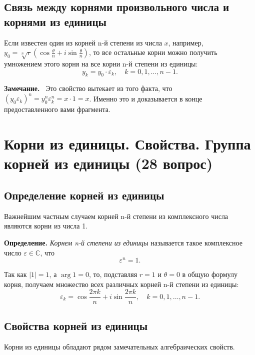 \documentclass[a4paper,12pt]{article}
\newcommand{\myremark}{\textbf{Замечание.}\ }
\theoremstyle{definition}
\theoremstyle{plain}
\theoremstyle{remark}
\begin{document}
	\subsection{Связь между корнями произвольного числа и корнями из единицы}
	
	Если известен один из корней n-й степени из числа \( x \), например, \( y_0 = \sqrt[n]{r}(\cos \frac{\theta}{n} + i \sin \frac{\theta}{n}) \), то все остальные корни можно получить умножением этого корня на все корни n-й степени из единицы:
	\[
	y_k = y_0 \cdot \varepsilon_k, \quad k = 0, 1, \dots, n-1.
	\]
	
	\myremark
	Это свойство вытекает из того факта, что \( (y_0 \varepsilon_k)^n = y_0^n \varepsilon_k^n = x \cdot 1 = x \). Именно это и доказывается в конце предоставленного вами фрагмента.
	
	
	
	
	
	
	
	\newpage
	\section{Корни из единицы. Свойства. Группа корней из единицы (28 вопрос)}
	
	\subsection{Определение корней из единицы}
	
	Важнейшим частным случаем корней n-й степени из комплексного числа являются корни из числа 1.
	
	\medskip
	
	\noindent \textbf{Определение.} \textit{Корнем n-й степени из единицы} называется такое комплексное число \( \varepsilon \in \mathbb{C} \), что
	\[
	\varepsilon^n = 1.
	\]
	
	Так как \( |1| = 1 \), а \( \arg 1 = 0 \), то, подставляя \( r = 1 \) и \( \theta = 0 \) в общую формулу корня, получаем множество всех различных корней n-й степени из единицы:
	\[
	\varepsilon_k = \cos \frac{2\pi k}{n} + i \sin \frac{2\pi k}{n}, \quad k = 0, 1, \dots, n-1.
	\]
	
	\subsection{Свойства корней из единицы}
	
	Корни из единицы обладают рядом замечательных алгебраических свойств.
	
\end{document}
